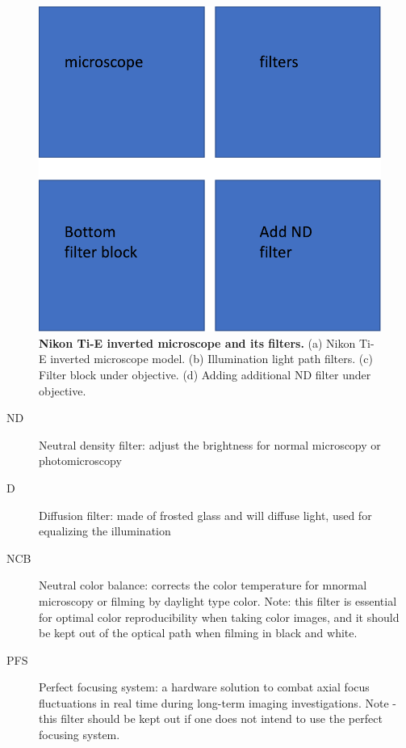 \begin{figure}[!htbp]
	\begin{center}
	\includegraphics[width=5.5 in]{Figs/2-Exp/3.pdf}
	\end{center}
	\caption[Figure 2.3:]
	{
	\textbf{Nikon Ti-E inverted microscope and its filters.}
	(a) Nikon Ti-E inverted microscope model.
	(b) Illumination light path filters.
	(c) Filter block under objective.
	(d) Adding additional ND filter under objective.
	}
	\label{fig:2-3}
\end{figure}

\begin{description}
	\item [ND] Neutral density filter: adjust the brightness for normal microscopy or photomicroscopy
	\item [D] Diffusion filter: made of frosted glass and will diffuse light, used for equalizing the illumination
	\item [NCB] Neutral color balance: corrects the color temperature for mnormal microscopy or filming by daylight type color. Note: this filter is essential for optimal color reproducibility when taking color images, and it should be kept out of the optical path when filming in black and white.
	\item [PFS] Perfect focusing system: a hardware solution to combat axial focus fluctuations in real time during long-term imaging investigations. Note - this filter should be kept out if one does not intend to use the perfect focusing system.
\end{description}

